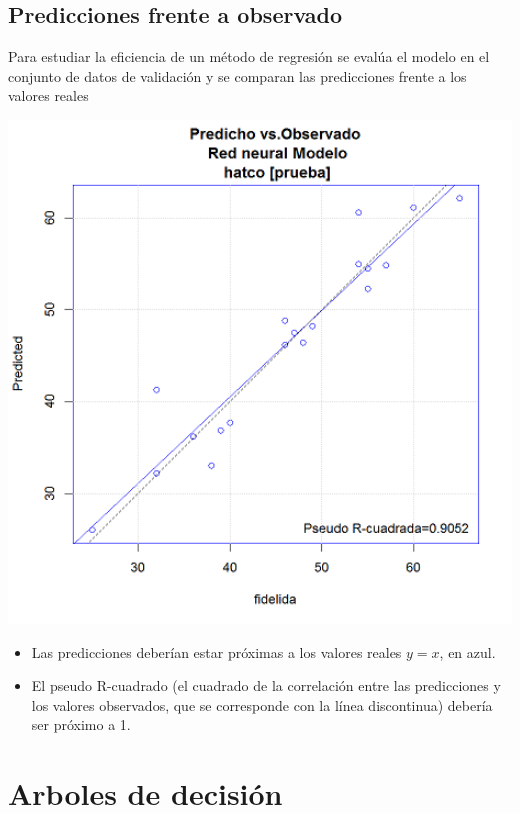 \documentclass[]{book}
\begin{document}
\hypertarget{predicciones-frente-a-observado}{%
\subsection{Predicciones frente a observado}\label{predicciones-frente-a-observado}}

Para estudiar la eficiencia de un método de regresión se evalúa el
modelo en el conjunto de datos de validación y se comparan las
predicciones frente a los valores reales

\includegraphics[width=6.38in]{images/predobs}

\begin{itemize}
\item
  Las predicciones deberían estar próximas a los valores reales
  \(y=x\), en azul.
\item
  El pseudo R-cuadrado (el cuadrado de la correlación entre las
  predicciones y los valores observados, que se corresponde con la
  línea discontinua) debería ser próximo a 1.
\end{itemize}

\hypertarget{arboles-de-decision}{%
\section{Arboles de decisión}\label{arboles-de-decision}}
\end{document}
